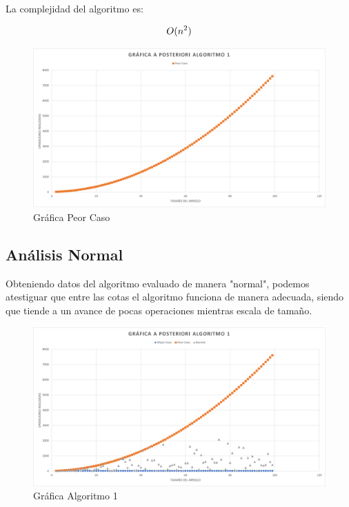         La complejidad del algoritmo es: 
        
        \[\Large{O}(n^2) \]
        
        \begin{figure}[htp!]
            \centering
            \includegraphics[width=1 \textwidth]{Images/Graf_PeorCaso.png}
            \caption{Gráfica Peor Caso}
            \label{fig:my_label}
        \end{figure}
    
    \newpage
    \subsection{Análisis Normal}
        Obteniendo datos del algoritmo evaluado de manera "normal", podemos atestiguar que entre las cotas el algoritmo funciona de manera adecuada, siendo que tiende a un avance de pocas operaciones mientras escala de tamaño.
        
        \begin{figure}[htp!]
            \centering
            \includegraphics[width=1 \textwidth]{Images/Graf_Normal.png}  
            \caption{Gráfica Algoritmo 1}
            \label{fig:my_label}
        \end{figure}
    
